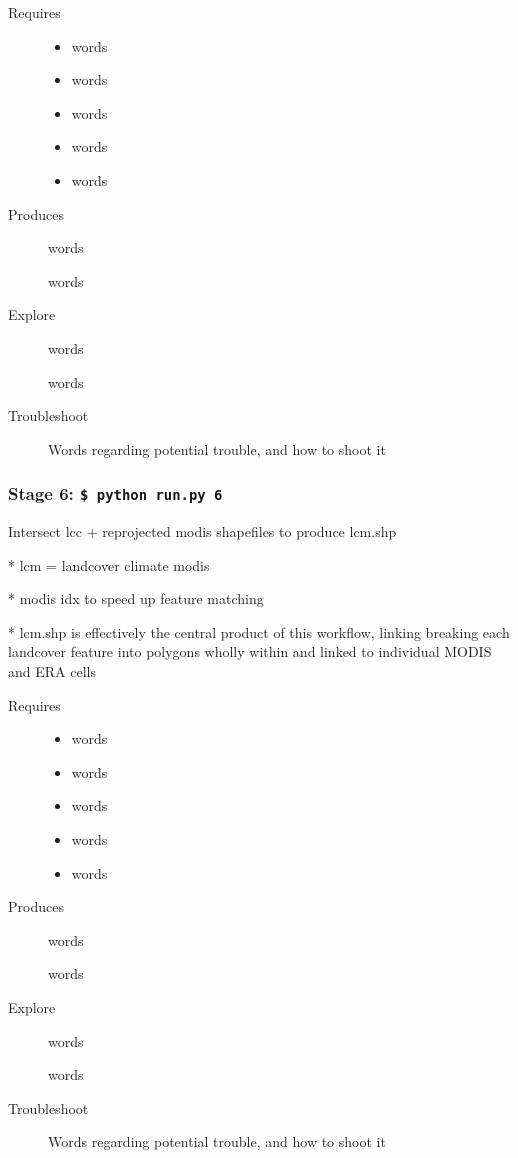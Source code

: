 \documentclass[twoside,a4paper]{refart}
\begin{document}
  \begin{description}
    \item [Requires]
      \begin{itemize}
        \item
          words
        \item
          words
        \item
          words
        \item
          words
        \item
          words

      \end{itemize}
  
  
    \item [Produces]
      words
      
      words
      

    \item [Explore]
      words
      
      words

    \item [Troubleshoot]
      Words regarding potential trouble, and how to shoot it
  \end{description}


\subsubsection{\textbf{Stage 6:} \texttt{\$ python run.py 6}}
        Intersect lcc + reprojected modis shapefiles to produce lcm.shp
        
        * lcm = landcover climate modis
        
        * modis idx to speed up feature matching
        
        * lcm.shp is effectively the central product of this workflow, linking
          breaking each landcover feature into polygons wholly within and
          linked to individual MODIS and ERA cells

  \begin{description}
    \item [Requires]
      \begin{itemize}
        \item
          words
        \item
          words
        \item
          words
        \item
          words
        \item
          words

      \end{itemize}
  
  
    \item [Produces]
      words
      
      words
      

    \item [Explore]
      words
      
      words

    \item [Troubleshoot]
      Words regarding potential trouble, and how to shoot it
  \end{description}
\end{document}
